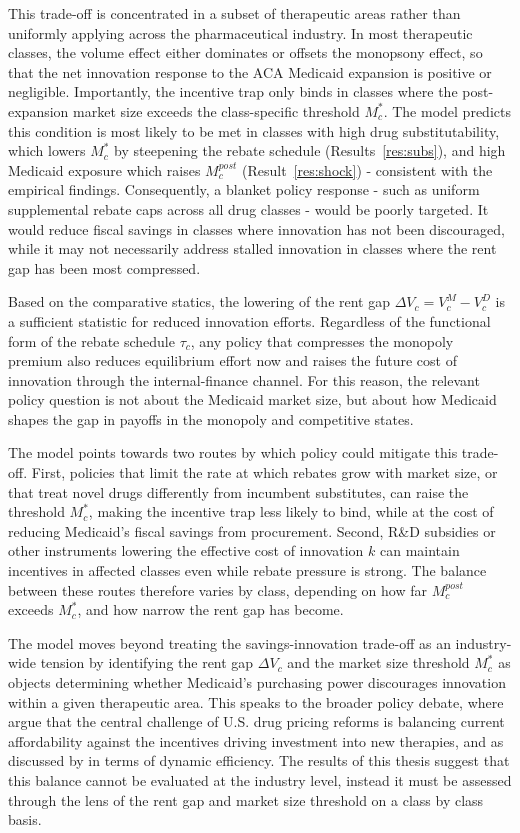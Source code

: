 \documentclass[12pt]{article}
\begin{document}
This trade-off is concentrated in a subset of therapeutic areas rather than uniformly applying across the pharmaceutical industry. In most therapeutic classes, the volume effect either dominates or offsets the monopsony effect, so that the net innovation response to the ACA Medicaid expansion is positive or negligible. Importantly, the incentive trap only binds in classes where the post-expansion market size exceeds the class-specific threshold $M_c^*$. The model predicts this condition is most likely to be met in classes with high drug substitutability, which lowers $M_c^*$ by steepening the rebate schedule (Results~\ref{res:subs}), and high Medicaid exposure which raises $M_c^{post}$ (Result~\ref{res:shock}) - consistent with the empirical findings. Consequently, a blanket policy response - such as uniform supplemental rebate caps across all drug classes - would be poorly targeted. It would reduce fiscal savings in classes where innovation has not been discouraged, while it may not necessarily address stalled innovation in classes where the rent gap has been most compressed.

Based on the comparative statics, the lowering of the rent gap $\Delta V_c = V_c^M - V_c^D$ is a sufficient statistic for reduced innovation efforts. Regardless of the functional form of the rebate schedule $\tau_c$, any policy that compresses the monopoly premium also reduces equilibrium effort now and raises the future cost of innovation through the internal-finance channel. For this reason, the relevant policy question is not about the Medicaid market size, but about how Medicaid shapes the gap in payoffs in the monopoly and competitive states.

The model points towards two routes by which policy could mitigate this trade-off. First, policies that limit the rate at which rebates grow with market size, or that treat novel drugs differently from incumbent substitutes, can raise the threshold $M_c^*$, making the incentive trap less likely to bind, while at the cost of reducing Medicaid's fiscal savings from procurement. Second, R\&D subsidies or other instruments lowering the effective cost of innovation $k$ can maintain incentives in affected classes even while rebate pressure is strong. The balance between these routes therefore varies by class, depending on how far $M_c^{post}$ exceeds $M^*_c$, and how narrow the rent gap has become.

The model moves beyond treating the savings-innovation trade-off as an industry-wide tension by identifying the rent gap $\Delta V_c$ and the market size threshold $M_c^*$ as objects determining whether Medicaid's purchasing power discourages innovation within a given therapeutic area. This speaks to the broader policy debate, where \citet{garthwaite2023drug} argue that the central challenge of U.S. drug pricing reforms is balancing current affordability against the incentives driving investment into new therapies, and as discussed by \citet{woods2024achieving} in terms of dynamic efficiency. The results of this thesis suggest that this balance cannot be evaluated at the industry level, instead it must be assessed through the lens of the rent gap and market size threshold on a class by class basis.
\end{document}
